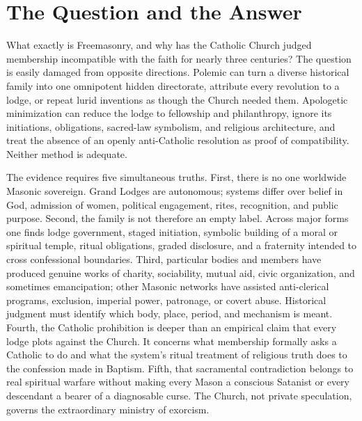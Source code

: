 \section{The Question and the Answer}

What exactly is Freemasonry, and why has the Catholic Church judged membership incompatible with the faith for nearly three centuries? The question is easily damaged from opposite directions. Polemic can turn a diverse historical family into one omnipotent hidden directorate, attribute every revolution to a lodge, or repeat lurid inventions as though the Church needed them. Apologetic minimization can reduce the lodge to fellowship and philanthropy, ignore its initiations, obligations, sacred-law symbolism, and religious architecture, and treat the absence of an openly anti-Catholic resolution as proof of compatibility. Neither method is adequate.

The evidence requires five simultaneous truths. First, there is no one worldwide Masonic sovereign. Grand Lodges are autonomous; systems differ over belief in God, admission of women, political engagement, rites, recognition, and public purpose. Second, the family is not therefore an empty label. Across major forms one finds lodge government, staged initiation, symbolic building of a moral or spiritual temple, ritual obligations, graded disclosure, and a fraternity intended to cross confessional boundaries. Third, particular bodies and members have produced genuine works of charity, sociability, mutual aid, civic organization, and sometimes emancipation; other Masonic networks have assisted anti-clerical programs, exclusion, imperial power, patronage, or covert abuse. Historical judgment must identify which body, place, period, and mechanism is meant. Fourth, the Catholic prohibition is deeper than an empirical claim that every lodge plots against the Church. It concerns what membership formally asks a Catholic to do and what the system's ritual treatment of religious truth does to the confession made in Baptism. Fifth, that sacramental contradiction belongs to real spiritual warfare without making every Mason a conscious Satanist or every descendant a bearer of a diagnosable curse. The Church, not private speculation, governs the extraordinary ministry of exorcism.


